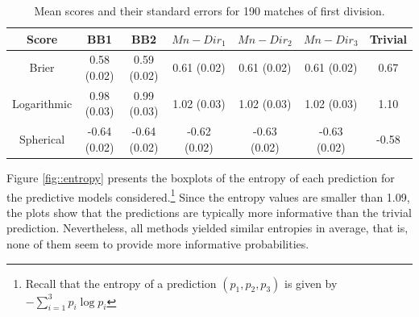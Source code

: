 \documentclass[journal,article,accept,moreauthors,pdftex,12pt,a4paper]{mdpi}
\begin{document}
    \begin{table}[H]
        \begin{center}
            \begin{tabular}{ccccccc}
                \hline
                Score & BB1 & BB2 & $Mn-Dir_1$ & $Mn-Dir_2$ & $Mn-Dir_3$ & Trivial \\
                \hline
                \hline
                Brier &0.58 (0.02) & 0.59 (0.02)& 0.61 (0.02)& 0.61 (0.02) & 0.61  (0.02) & 0.67 \\
                Logarithmic & 0.98 (0.03) & 0.99 (0.03) & 1.02 (0.03)  & 1.02 (0.03)  & 1.02 (0.03) & 1.10  \\
                Spherical &  -0.64 (0.02)& -0.64 (0.02)& -0.62 (0.02)& -0.63 (0.02)& -0.63 (0.02)& -0.58\\
                \hline
            \end{tabular}
            \caption{Mean scores and their standard errors for 190 matches of first division.}
            \label{tab::brier}
        \end{center}
    \end{table}


    Figure \ref{fig::entropy} presents the boxplots of the entropy of each prediction for the predictive models considered.\footnote{Recall
        that the entropy of a prediction $(p_1,p_2,p_3)$ is given by $- \sum_{i=1}^3 p_i \log{p_i}$}
    Since the entropy values are smaller than 1.09, the plots show that the predictions
    are typically more informative than the trivial prediction. Nevertheless, all methods yielded similar entropies in average, that is,
    none of them seem to provide more informative probabilities.
\end{document}
